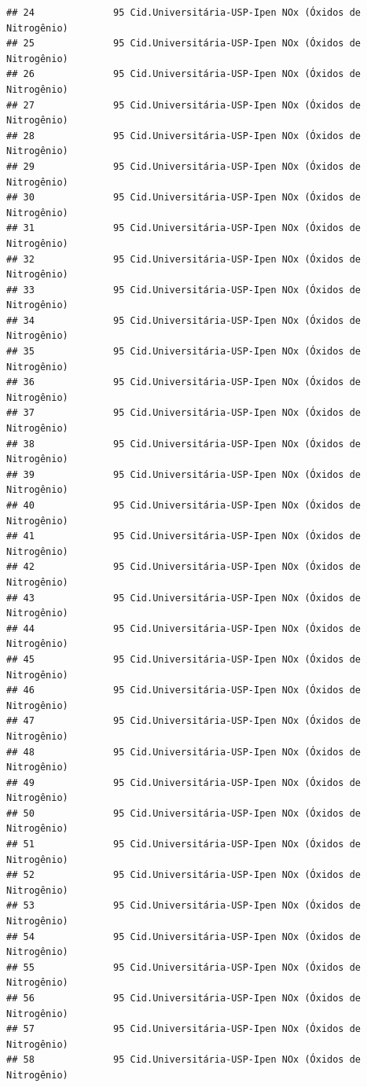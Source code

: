 \documentclass[]{book}
\begin{document}
\begin{verbatim}
## 24              95 Cid.Universitária-USP-Ipen NOx (Óxidos de Nitrogênio)
## 25              95 Cid.Universitária-USP-Ipen NOx (Óxidos de Nitrogênio)
## 26              95 Cid.Universitária-USP-Ipen NOx (Óxidos de Nitrogênio)
## 27              95 Cid.Universitária-USP-Ipen NOx (Óxidos de Nitrogênio)
## 28              95 Cid.Universitária-USP-Ipen NOx (Óxidos de Nitrogênio)
## 29              95 Cid.Universitária-USP-Ipen NOx (Óxidos de Nitrogênio)
## 30              95 Cid.Universitária-USP-Ipen NOx (Óxidos de Nitrogênio)
## 31              95 Cid.Universitária-USP-Ipen NOx (Óxidos de Nitrogênio)
## 32              95 Cid.Universitária-USP-Ipen NOx (Óxidos de Nitrogênio)
## 33              95 Cid.Universitária-USP-Ipen NOx (Óxidos de Nitrogênio)
## 34              95 Cid.Universitária-USP-Ipen NOx (Óxidos de Nitrogênio)
## 35              95 Cid.Universitária-USP-Ipen NOx (Óxidos de Nitrogênio)
## 36              95 Cid.Universitária-USP-Ipen NOx (Óxidos de Nitrogênio)
## 37              95 Cid.Universitária-USP-Ipen NOx (Óxidos de Nitrogênio)
## 38              95 Cid.Universitária-USP-Ipen NOx (Óxidos de Nitrogênio)
## 39              95 Cid.Universitária-USP-Ipen NOx (Óxidos de Nitrogênio)
## 40              95 Cid.Universitária-USP-Ipen NOx (Óxidos de Nitrogênio)
## 41              95 Cid.Universitária-USP-Ipen NOx (Óxidos de Nitrogênio)
## 42              95 Cid.Universitária-USP-Ipen NOx (Óxidos de Nitrogênio)
## 43              95 Cid.Universitária-USP-Ipen NOx (Óxidos de Nitrogênio)
## 44              95 Cid.Universitária-USP-Ipen NOx (Óxidos de Nitrogênio)
## 45              95 Cid.Universitária-USP-Ipen NOx (Óxidos de Nitrogênio)
## 46              95 Cid.Universitária-USP-Ipen NOx (Óxidos de Nitrogênio)
## 47              95 Cid.Universitária-USP-Ipen NOx (Óxidos de Nitrogênio)
## 48              95 Cid.Universitária-USP-Ipen NOx (Óxidos de Nitrogênio)
## 49              95 Cid.Universitária-USP-Ipen NOx (Óxidos de Nitrogênio)
## 50              95 Cid.Universitária-USP-Ipen NOx (Óxidos de Nitrogênio)
## 51              95 Cid.Universitária-USP-Ipen NOx (Óxidos de Nitrogênio)
## 52              95 Cid.Universitária-USP-Ipen NOx (Óxidos de Nitrogênio)
## 53              95 Cid.Universitária-USP-Ipen NOx (Óxidos de Nitrogênio)
## 54              95 Cid.Universitária-USP-Ipen NOx (Óxidos de Nitrogênio)
## 55              95 Cid.Universitária-USP-Ipen NOx (Óxidos de Nitrogênio)
## 56              95 Cid.Universitária-USP-Ipen NOx (Óxidos de Nitrogênio)
## 57              95 Cid.Universitária-USP-Ipen NOx (Óxidos de Nitrogênio)
## 58              95 Cid.Universitária-USP-Ipen NOx (Óxidos de Nitrogênio)

\end{verbatim}
\end{document}
